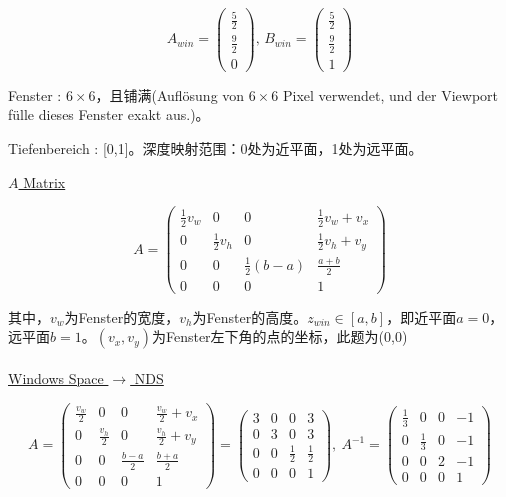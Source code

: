 \documentclass[fleqn]{article}
\begin{document}
$$A_{win}=\begin{pmatrix}
    \frac{5}{2}\\\frac{9}{2}\\0
\end{pmatrix},\,B_{win}=\begin{pmatrix}
    \frac{5}{2}\\\frac{9}{2}\\1
\end{pmatrix}$$

Fenster : $6\times 6$，且铺满(Auflösung von $6\times 6$ Pixel verwendet, und der Viewport fülle dieses Fenster exakt aus.)。

Tiefenbereich : [0,1]。深度映射范围：0处为近平面，1处为远平面。



\noindent\underline{$A$ Matrix}

$$A=\begin{pmatrix}
    \frac{1}{2}v_w&0&0&\frac{1}{2}v_w+v_x\\
    0&\frac{1}{2}v_h&0&\frac{1}{2}v_h+v_y\\
    0&0&\frac{1}{2}(b-a)&\frac{a+b}{2}\\
    0&0&0&1
\end{pmatrix}$$

其中，$v_w$为Fenster的宽度，$v_h$为Fenster的高度。$z_{win}\in[a,b]$，即近平面$a=0$，远平面$b=1$。$(v_x,v_y)$为Fenster左下角的点的坐标，此题为(0,0)
\\
\\
\noindent\underline{Windows Space $\rightarrow$ NDS}

$$A = 
\begin{pmatrix}
    \frac{v_w}{2} & 0 & 0 & \frac{v_w}{2}+v_x \\
    0 & \frac{v_h}{2} & 0 & \frac{v_h}{2}+v_y \\
    0 & 0 & \frac{b-a}{2} & \frac{b+a}{2} \\
    0 & 0 & 0 & 1
\end{pmatrix}=
\begin{pmatrix}
    3 & 0 & 0 & 3 \\
    0 & 3 & 0 & 3\\
    0 & 0 & \frac{1}{2} & \frac{1}{2}\\
    0 & 0 & 0 & 1
\end{pmatrix}
, \
A^{-1}=
\begin{pmatrix}
    \frac{1}{3} & 0 & 0 & -1\\
    0 & \frac{1}{3} & 0 & -1\\
    0&0&2&-1\\
    0&0&0&1
\end{pmatrix}
$$
\end{document}
